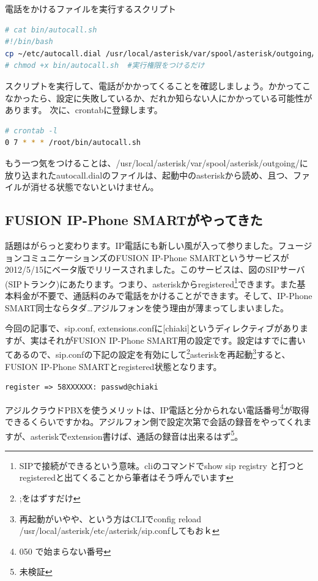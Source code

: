 電話をかけるファイルを実行するスクリプト

\begin{lstlisting}[language=bash]
# cat bin/autocall.sh 
#!/bin/bash
cp ~/etc/autocall.dial /usr/local/asterisk/var/spool/asterisk/outgoing/
# chmod +x bin/autocall.sh  #実行権限をつけるだけ
\end{lstlisting}
スクリプトを実行して、電話がかかってくることを確認しましょう。かかってこなかったら、設定に失敗しているか、だれか知らない人にかかっている可能性があります。
次に、crontabに登録します。
\begin{lstlisting}[language=bash]
# crontab -l 
0 7 * * * /root/bin/autocall.sh
\end{lstlisting}

もう一つ気をつけることは、/usr/local/asterisk/var/spool/asterisk/outgoing/に放り込まれたautocall.dialのファイルは、起動中のasteriskから読め、且つ、ファイルが消せる状態でないといけません。

\subsection{FUSION IP-Phone SMARTがやってきた}
話題はがらっと変わります。IP電話にも新しい風が入って参りました。フュージョンコミュニケーションズのFUSION IP-Phone SMARTというサービスが2012/5/15にベータ版でリリースされました。このサービスは、図のSIPサーバ(SIPトランク)にあたります。つまり、asteriskからregistered\footnote{SIPで接続ができるという意味。cliのコマンドでshow sip registry と打つとregisteredと出てくることから筆者はそう呼んでいます}できます。また基本料金が不要で、通話料のみで電話をかけることができます。そして、IP-Phone SMART同士ならタダ…アジルフォンを使う理由が薄まってしまいました。

今回の記事で、sip.conf, extensions.confに[chiaki]というディレクティブがありますが、実はそれがFUSION IP-Phone SMART用の設定です。設定はすでに書いてあるので、sip.confの下記の設定を有効にして\footnote{;をはずすだけ}asteriskを再起動\footnote{再起動がいやや、という方はCLIでconfig reload /usr/local/asterisk/etc/asterisk/sip.confしてもおｋ}すると、FUSION IP-Phone SMARTとregistered状態となります。

\begin{lstlisting}
register => 58XXXXXX: passwd@chiaki
\end{lstlisting}

アジルクラウドPBXを使うメリットは、IP電話と分かられない電話番号\footnote{050 で始まらない番号}が取得できるくらいですかね。アジルフォン側で設定次第で会話の録音をやってくれますが、asteriskでextension書けば、通話の録音は出来るはず\footnote{未検証}。


